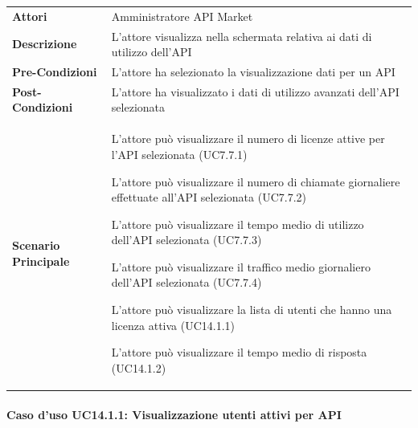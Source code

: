 \begin{minipage}{\linewidth}
	\begin{tabular}{ l | p{11cm}}
		\hline
		\rowcolor{Gray}
		\multicolumn{2}{c}{UC14.1 - Visualizzazione dati di utilizzo avanzati} \\
		\hline
		\textbf{Attori} &  Amministratore API Market \\
		\textbf{Descrizione} & L'attore visualizza nella schermata relativa ai dati di utilizzo dell'API \\
		\textbf{Pre-Condizioni} & L'attore ha selezionato la visualizzazione dati per un API \\
		\textbf{Post-Condizioni} & L'attore ha visualizzato i dati di utilizzo avanzati dell'API selezionata \\
		\textbf{Scenario Principale} & 
		\begin{enumerate*}[label=(\arabic*.),itemjoin={\newline}]
			\item L'attore può visualizzare il numero di licenze attive per l'API selezionata (UC7.7.1)
			\item L'attore può visualizzare il numero di chiamate giornaliere effettuate all'API selezionata (UC7.7.2)
			\item L'attore può visualizzare il tempo medio di utilizzo dell'API selezionata (UC7.7.3)
			\item L'attore può visualizzare il traffico medio giornaliero dell'API selezionata (UC7.7.4)
			\item L'attore può visualizzare la lista di utenti che hanno una licenza attiva (UC14.1.1)
			\item L'attore può visualizzare il tempo medio di risposta (UC14.1.2)
		\end{enumerate*}\\
	\end{tabular}
\end{minipage}

\paragraph{Caso d'uso UC14.1.1: Visualizzazione utenti attivi per API}
\label{UC14_1_1}

